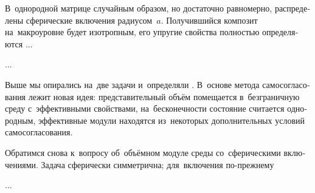 
\label{section:composites.materialwithsphericalinclusions}

\begin{otherlanguage}{russian}

В~однородной матрице случайным образом, но достаточно равномерно, распределены сферические включения радиусом~$a$. Получившийся композит на~макроуровне будет изотропным, его упругие свойства полностью определяются ...

...



\end{otherlanguage}



\label{section:composites.selfconsistentmethod}

\begin{otherlanguage}{russian}

Выше мы опирались на~две задачи   и~определяли   .
В~основе метода самосогласования лежит новая идея: представительный объём помещается в~безграничную среду с~эффективными свойствами, на~бесконечности состояние считается однородным, эффективные модули находятся из~некоторых дополнительных условий самосогласования.

Обратимся снова к~вопросу об~объёмном модуле среды со~сферическими включениями.
Задача сферически симметрична; для~включения по\hbox{-}прежнему

...



\end{otherlanguage}


